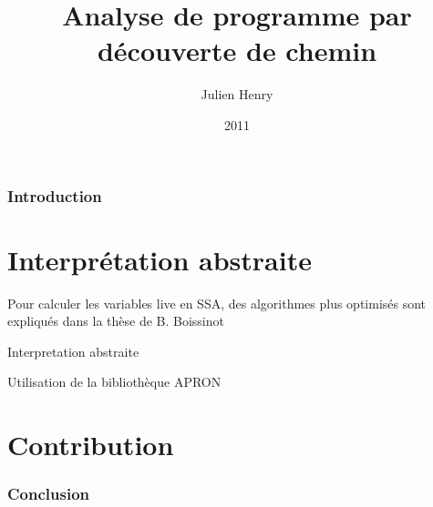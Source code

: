 \documentclass[a4paper,english,titlepage]{article}
\title{Analyse de programme par découverte de chemin}
\author{Julien Henry}
\date{2011}
\institute{Grenoble-INP}
\begin{document}
  
  \maketitlepage

  \tableofcontents
  
  \newpage

\section{Introduction} 

\part{Interprétation abstraite}
  
	Pour calculer les variables live en SSA, des algorithmes plus optimisés sont
	expliqués dans la thèse de B. Boissinot\cite{Boi10}

	Interpretation abstraite
	\cite{CC77}
	\cite{CH78}
	
	\cite{GopanR06}
	
	Utilisation de la bibliothèque APRON \cite{JM09}
  

\part{Contribution}

  \section{Conclusion}
  
  \appendix
  


  
\end{document}

